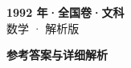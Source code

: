 \documentclass[zihao=-4, a4paper]{ctexart}
\begin{document}
\begin{center}
  {\Large\bfseries 1992 年·全国卷·文科}\\[4pt]
  {\large 数学 · 解析版}
\end{center}
\medskip
{}

\clearpage
{}
\begin{center}{\Large\bfseries 参考答案与详细解析}\end{center}
\medskip

\end{document}
